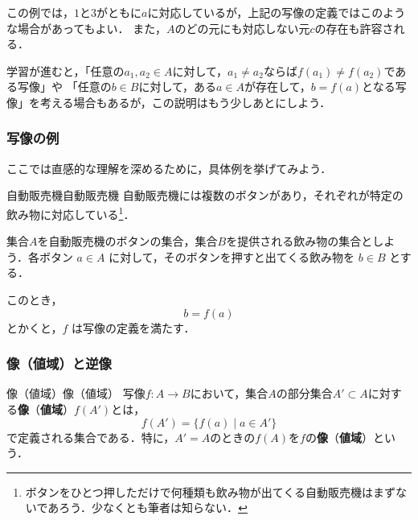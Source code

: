 \documentclass[a4paper,11pt]{ltjsarticle}
\renewcommand{\emph}[1]{\textbf{#1}}
\begin{document}
この例では，$1$と$3$がともに$a$に対応しているが，上記の写像の定義ではこのような場合があってもよい．
また，$A$のどの元にも対応しない元$c$の存在も許容される．

学習が進むと，「任意の$ a_1 , a_2 \in A$に対して，$ a_1 \ne a_2$ならば$f(a_1) \ne f(a_2)$である写像」や
「任意の$ b \in B$に対して，ある$a \in A$が存在して，$b=f(a)$となる写像」を考える場合もあるが，この説明はもう少しあとにしよう．

\subsubsection{写像の例}

ここでは直感的な理解を深めるために，具体例を挙げてみよう．

\begin{example}{自動販売機}{自動販売機}
  自動販売機には複数のボタンがあり，それぞれが特定の飲み物に対応している\footnote{ボタンをひとつ押しただけで何種類も飲み物が出てくる自動販売機はまずないであろう．少なくとも筆者は知らない．}．

  集合$A$を自動販売機のボタンの集合，集合$B$を提供される飲み物の集合としよう．各ボタン $a \in A$ に対して，そのボタンを押すと出てくる飲み物を $b \in B$ とする．

  このとき，
  \[
    b=f(a)
  \]
  とかくと，$f$ は写像の定義を満たす．
\end{example}


\subsubsection{像（値域）と逆像}

\begin{definition}{像（値域）}{像（値域）}
  写像$f \colon A \to B$において，集合$A$の部分集合$A' \subset A$に対する\emph{像}（\emph{値域}）$f(A')$とは，
  \[
    f(A') = \{ f(a) \mid a \in A' \}
  \]
  で定義される集合である．特に，$A' = A$のときの$f(A)$を$f$の\emph{像}（\emph{値域}）という．

   
\end{definition}
\end{document}
